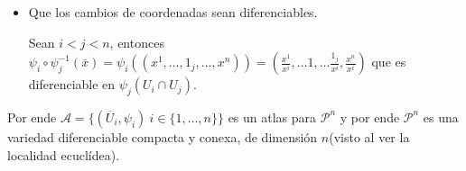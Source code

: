 \documentclass[11pt]{article}
\renewcommand{\P}{\mathcal{P}}
\newcommand{\sett}[1]{\{#1\}}
\newenvironment{proof}[1][Demostraci\'on]{\begin{trivlist}
\item[\hskip \labelsep {\bfseries #1}]}{\end{trivlist}}
\newcommand{\qed}{\nobreak \ifvmode \relax \else
      \ifdim\lastskip<1.5em \hskip-\lastskip
      \hskip1.5em plus0em minus0.5em \fi \nobreak
      \vrule height0.75em width0.5em depth0.25em\fi}
\begin{document}
\begin{proof}
\begin{itemize}
\begin{enumerate}
\end{enumerate} 

\item Que los cambios de coordenadas sean diferenciables.

Sean $i < j < n$, entonces $\psi_i \circ \psi_{j}^{-1} (\overline{x}) = \psi_i ((x^1 , \dots , 1_j , \dots , x^n)) = ( \frac{x^1}{x^{i}} , \dots 1 , \dots \frac{1_j}{x^{i}}, \frac{x^n}{x^{i}})$ que es diferenciable en $\psi_j(U_i \cap U_j)$.

\end{itemize}

Por ende $\mathcal{A} = \sett{( \overline{U}_i , \psi_i) \ i \in \sett{1,\dots,n}}$ es un atlas para $\P^n$ y por ende $\P^n$ es una variedad diferenciable compacta y conexa, de dimensi\'on $n$(visto al ver la localidad ecucl\'idea). \qed

\end{proof}
\end{document}
